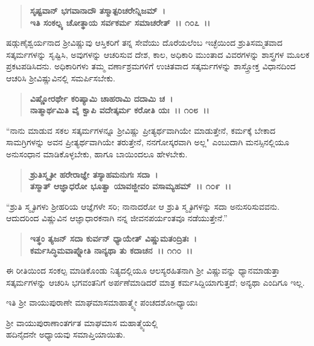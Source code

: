 \begin{verse}
\textbf{ಸೃಷ್ಟವಾನ್ ಭಗವಾನಾದೌ ತಸ್ಮಾತ್ಪರಿಚರೇನ್ನಿಜಮ್~।}\\\textbf{ಇತಿ ಸಂಕಲ್ಪ್ಯ ಚೋತ್ಥಾಯ ಸರ್ವಕರ್ಮ ಸಮಾಚರೇತ್~।। ೧೦೭~।।}
\end{verse}

ಷಡ್ಗುಣೈಶ್ವರ್ಯನಾದ ಶ‍್ರೀವಿಷ್ಣುವು ಆಸ್ತಿಕರಿಗೆ ತನ್ನ ಸೇವೆಯು ದೊರೆಯಲೆಂಬ ಇಚ್ಛೆಯಿಂದ ಶ್ರುತಿಸಮ್ಮತವಾದ ಸತ್ಕರ್ಮಗಳನ್ನು ಸೃಷ್ಟಿಸಿ, ಅವುಗಳನ್ನು ಆಚರಿಸುವ ದೇಶ, ಕಾಲ, ಅಧಿಕಾರಿ ಮುಂತಾದ ವಿವರಗಳನ್ನು ಶಾಸ್ತ್ರಗಳ ಮೂಲಕ ಪ್ರಕಟಪಡಿಸಿದನು. ಅಧಿಕಾರಿಗಳು ತಮ್ಮ ವರ್ಣಾಶ್ರಮಗಳಿಗೆ ಉಚಿತವಾದ ಸತ್ಕರ್ಮಗಳನ್ನು ಶಾಸ್ತ್ರೋಕ್ತ ವಿಧಾನದಿಂದ ಆಚರಿಸಿ ಶ‍್ರೀವಿಷ್ಣುವಿನಲ್ಲಿ ಸಮರ್ಪಿಸಬೇಕು.

\begin{verse}
\textbf{ವಿಷ್ಣೋರರ್ಥೇ ಕರಿಷ್ಯಾಮಿ ಚಾಹರಾಮಿ ದದಾಮಿ ಚ~।}\\\textbf{ನಾತ್ಮಾರ್ಥಮಿತಿ ವೈ ಕ್ವಾಪಿ ವದೇತ್ಕರ್ಮ ಕರೋತಿ ಯಃ~।। ೧೦೮~।।}
\end{verse}

“ನಾನು ಮಾಡುವ ಸಕಲ ಸತ್ಕರ್ಮಗಳನ್ನೂ ಶ‍್ರೀವಿಷ್ಣು ಪ್ರೀತ್ಯರ್ಥವಾಗಿಯೇ ಮಾಡುತ್ತೇನೆ, ಕರ್ಮಕ್ಕೆ ಬೇಕಾದ ಸಾಮಗ್ರಿಗಳನ್ನು ಅವನ ಪ್ರೀತ್ಯರ್ಥವಾಗಿಯೇ ತರುತ್ತೇನೆ, ನನಗೋಸ್ಕರವಾಗಿ ಅಲ್ಲ" ಎಂಬುದಾಗಿ ಮನಸ್ಸಿನಲ್ಲಿಯೂ ಅನುಸಂಧಾನ ಮಾಡಿಕೊಳ್ಳಬೇಕು, ಹಾಗೂ ಬಾಯಿಂದಲೂ ಹೇಳಬೇಕು.

\begin{verse}
\textbf{ಶ್ರುತಿಸ್ಮೃತೀ ಹರೇರಾಜ್ಞೇ ತಸ್ಯಾಹಮನುಗಃ ಸದಾ~।}\\\textbf{ತಸ್ಮಾತ್ ಆಜ್ಞಾಧರೋ ಭೂತ್ವಾ ಯಾವಜ್ಜೀವಂ ವಸಾಮ್ಯಹಮ್~।। ೧೦೯~।।}
\end{verse}

“ಶ್ರುತಿ ಸ್ಮೃತಿಗಳು ಶ‍್ರೀಹರಿಯ ಆಜ್ಞೆಗಳೇ ಸರಿ; ನಾನಾದರೋ ಆ ಶ್ರುತಿ ಸ್ಮೃತಿಗಳನ್ನು ಸದಾ ಅನುಸರಿಸುವವನು. ಆದುದರಿಂದ ವಿಷ್ಣುವಿನ ಆಜ್ಞಾಧಾರಕನಾಗಿ ನನ್ನ ಜೀವನಪರ್ಯಂತವೂ ನಡೆಯುತ್ತೇನೆ.”

\begin{verse}
\textbf{ಇತ್ಥಂ ತ್ಯಜನ್ ಸದಾ ಕುರ್ವನ್ ಧ್ಯಾಯೇತ್ ವಿಷ್ಣುಮತಂದ್ರಿತಃ~।}\\\textbf{ಕರ್ಮಸಿದ್ಧಿಮವಾಪ್ನೋತಿ ನಾನ್ಯಥಾ ತು ಕದಾಚನ~।। ೧೧೦~।।}
\end{verse}

ಈ ರೀತಿಯಿಂದ ಸಂಕಲ್ಪ ಮಾಡಿಕೊಂಡು ನಿತ್ಯದಲ್ಲಿಯೂ ಆಲಸ್ಯರಹಿತನಾಗಿ ಶ‍್ರೀ ವಿಷ್ಣುವನ್ನು ಧ್ಯಾನಮಾಡುತ್ತಾ ಸತ್ಕರ್ಮಗಳನ್ನು ಆಚರಿಸಿ ಭಗವಂತನಿಗೆ ಅರ್ಪಣೆಮಾಡಿದರೆ ಮಾತ್ರ ಕರ್ಮಸಿದ್ದಿಯಾಗುತ್ತದೆ; ಅನ್ಯಥಾ ಎಂದಿಗೂ ಇಲ್ಲ.

\begin{center}
ಇತಿ ಶ‍್ರೀ ವಾಯುಪುರಾಣೇ ಮಾಘಮಾಸಮಾಹಾತ್ಮ್ಯೇ ಪಂಚದಶೋsಧ್ಯಾಯಃ 
\end{center}

\begin{center}
ಶ‍್ರೀ ವಾಯುಪುರಾಣಾಂತರ್ಗತ ಮಾಘಮಾಸ ಮಹಾತ್ಮ್ಯೆಯಲ್ಲಿ \\ ಹದಿನೈದನೇ ಅಧ್ಯಾಯವು ಸಮಾಪ್ತಿಯಾಯಿತು.
\end{center}

